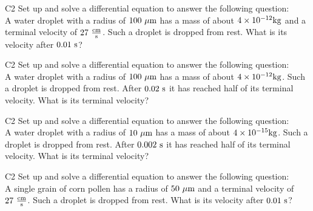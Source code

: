 \begin{problem}{C2}
Set up and solve a differential equation to answer the following question: \\
A water droplet with a radius of \(100\ {\rm \mu m}\) has a mass of about \(4 \times 10^{-12} {\rm kg}\) and a terminal velocity of \(27\ {\rm \frac{cm}{s}}\).  Such a droplet is dropped from rest.  What is its velocity after \(0.01\ {\rm s}\)?
\end{problem}

\begin{problem}{C2}
Set up and solve a differential equation to answer the following question: \\
A water droplet with a radius of \(100\ {\rm \mu m}\) has a mass of about \(4 \times 10^{-12} {\rm kg}\).  Such a droplet is dropped from rest.  After \(0.02\ {\rm s}\) it has reached half of its terminal velocity.  What is its terminal velocity?
\end{problem}

\begin{problem}{C2}
Set up and solve a differential equation to answer the following question: \\
A water droplet with a radius of \(10\ {\rm \mu m}\) has a mass of about \(4 \times 10^{-15} {\rm kg}\).  Such a droplet is dropped from rest.  After \(0.002\ {\rm s}\) it has reached half of its terminal velocity.  What is its terminal velocity?
\end{problem}

\begin{problem}{C2}
Set up and solve a differential equation to answer the following question: \\
A single grain of corn pollen has a radius of \(50\ {\rm \mu m}\) and a terminal velocity of \(27\ {\rm \frac{cm}{s}}\).  Such a droplet is dropped from rest.  What is its velocity after \(0.01\ {\rm s}\)?
\end{problem}
